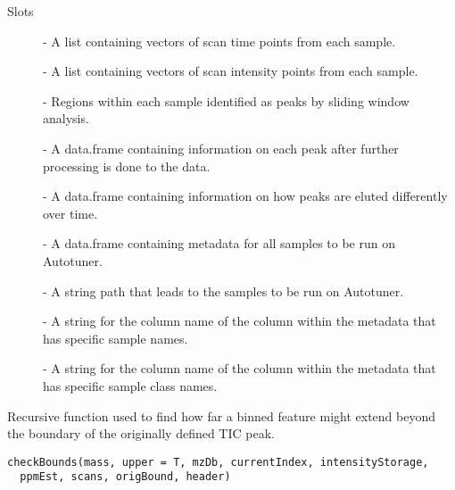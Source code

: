 \documentclass[a4paper]{book}
\begin{document}
\begin{Section}{Slots}

\begin{description}

\item[] - A list containing vectors of scan time points from each sample.

\item[] - A list containing vectors of scan intensity points from
each sample.

\item[] - Regions within each sample identified as peaks by sliding
window analysis.

\item[] - A data.frame containing information on each peak after
further processing is done to the data.

\item[] - A data.frame containing information on how peaks
are eluted differently over time.

\item[] - A data.frame containing metadata for all samples to be
run on Autotuner.

\item[] - A string path that leads to the samples to be run on
Autotuner.

\item[] - A string for the column name of the column within the
metadata that has specific sample names.

\item[] - A string for the column name of the column within the
metadata that has specific sample class names.

\end{description}
\end{Section}
%
\begin{Description}\relax
Recursive function used to find how far a binned feature might
extend beyond the boundary of the originally defined TIC peak.
\end{Description}
%
\begin{Usage}
\begin{verbatim}
checkBounds(mass, upper = T, mzDb, currentIndex, intensityStorage,
  ppmEst, scans, origBound, header)
\end{verbatim}
\end{Usage}
\end{document}
